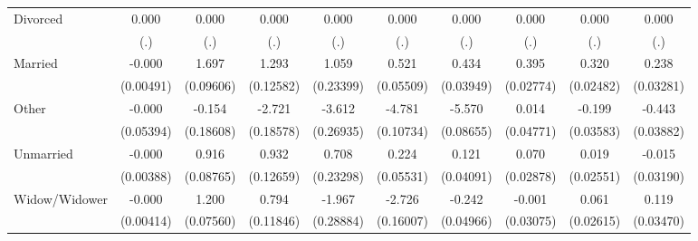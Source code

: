{\begin{tabular}{l*{9}{c}}
Divorced            &       0.000         &       0.000         &       0.000         &       0.000         &       0.000         &       0.000         &       0.000         &       0.000         &       0.000         \\
                    &         (.)         &         (.)         &         (.)         &         (.)         &         (.)         &         (.)         &         (.)         &         (.)         &         (.)         \\
Married             &      -0.000         &       1.697\sym{***}&       1.293\sym{***}&       1.059\sym{***}&       0.521\sym{***}&       0.434\sym{***}&       0.395\sym{***}&       0.320\sym{***}&       0.238\sym{***}\\
                    &   (0.00491)         &   (0.09606)         &   (0.12582)         &   (0.23399)         &   (0.05509)         &   (0.03949)         &   (0.02774)         &   (0.02482)         &   (0.03281)         \\
Other               &      -0.000         &      -0.154         &      -2.721\sym{***}&      -3.612\sym{***}&      -4.781\sym{***}&      -5.570\sym{***}&       0.014         &      -0.199\sym{***}&      -0.443\sym{***}\\
                    &   (0.05394)         &   (0.18608)         &   (0.18578)         &   (0.26935)         &   (0.10734)         &   (0.08655)         &   (0.04771)         &   (0.03583)         &   (0.03882)         \\
Unmarried           &      -0.000         &       0.916\sym{***}&       0.932\sym{***}&       0.708\sym{**} &       0.224\sym{***}&       0.121\sym{**} &       0.070\sym{*}  &       0.019         &      -0.015         \\
                    &   (0.00388)         &   (0.08765)         &   (0.12659)         &   (0.23298)         &   (0.05531)         &   (0.04091)         &   (0.02878)         &   (0.02551)         &   (0.03190)         \\
Widow/Widower       &      -0.000         &       1.200\sym{***}&       0.794\sym{***}&      -1.967\sym{***}&      -2.726\sym{***}&      -0.242\sym{***}&      -0.001         &       0.061\sym{*}  &       0.119\sym{***}\\
                    &   (0.00414)         &   (0.07560)         &   (0.11846)         &   (0.28884)         &   (0.16007)         &   (0.04966)         &   (0.03075)         &   (0.02615)         &   (0.03470)         \\

\end{tabular}}
